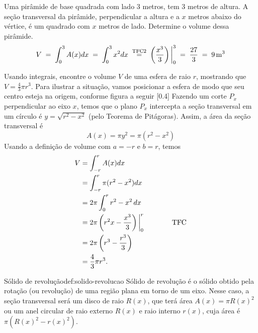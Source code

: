 \begin{example}
  Uma pirâmide de base quadrada com lado $3$ metros, tem $3$ metros de altura.
  A seção transversal da pirâmide, perpendicular a altura e a $x$ metros abaixo
  do vértice, é um quadrado com $x$ metros de lado. Determine o volume dessa
  pirâmide.
  \solution
  \[
    V
    \;=\; \int_0^3 A(x) dx
    \;=\; \int_0^3 x^2 dx
    \;\stackrel{\text{\scriptsize TFC2}}{=}\; \left(\frac{x^3}{3}\right) \bigg\rvert_{0}^{3}
    \;=\; \frac{27}{3}
    \;=\; 9 \,\si{\meter^3}
  \]
\end{example}

\begin{example}
  Usando integrais, encontre o volume $V$ de uma esfera de raio $r$,
  mostrando que \(V= \frac{4}{3}\pi r^3\).
  \solution
  Para ilustrar a situação, vamos posicionar a esfera de modo que seu centro
  esteja na origem, conforme figura a seguir
  [0.4]
  Fazendo um corte $P_x$ perpendicular ao eixo $x$, temos que o plano $P_x$
  intercepta a seção transversal em um círculo é $y=\sqrt{r^2-x^2}$
  (pelo Teorema de Pitágoras). Assim, a área da seção transversal é
  \[
    A(x)
    = \pi y^2
    = \pi \left( r^2 - x^2 \right)
  \]
  Usando a definição de volume com $a=-r$ e $b=r$, temos
  \begin{align*}
    V & = \int_{-r}^{r}A(x)dx                                                \\
      & = \int_{-r}^{r}\pi (r^2-x^2)dx                                       \\
      & = 2 \pi\int_{0}^{r} r^2-x^2\,dx                                      \\
      & = 2 \pi \left( r^2 x-\frac{x^3}{3}\right) \bigg\rvert_{0}^{r} \qquad\qquad \text{TFC} \\
      & =2 \pi \left( r^3-\frac{r^3}{3}\right)                               \\
      & = \frac{4}{3} \pi r^3.
  \end{align*}
\end{example}

\begin{definicao}{Sólido de revolução}{def:solido-revolucao}
  Sólido de revolução é o sólido obtido pela rotação (ou revolução)
  de uma região plana em torno de um eixo. Nesse caso, a seção transversal
  será um disco de raio $R(x)$, que terá área
  \(
    A(x)= \pi R(x)^2
  \)
  ou um anel circular de raio externo $R(x)$ e raio interno $r(x)$, cuja área é
  \(
    \pi \left( R(x)^2 - r(x)^2 \right)
  \).
\end{definicao}

